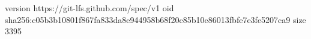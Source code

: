 version https://git-lfs.github.com/spec/v1
oid sha256:c05b3b10801f867fa833da8e944958b68f20c85b10e86013fbfe7e3fe5207ca9
size 3395
